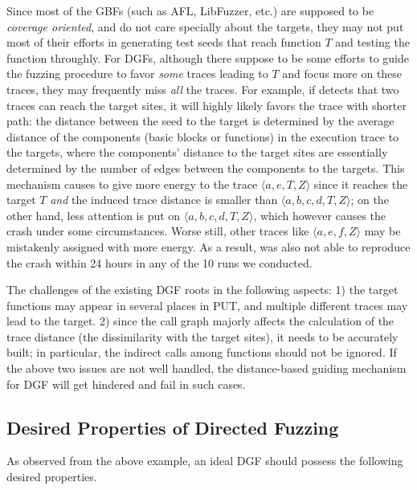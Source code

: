 Since most of the GBFs (such as AFL, LibFuzzer, etc.) are supposed to be \emph{coverage oriented}, and do not care specially about the targets, they may not put most of their efforts in generating test seeds that reach function $T$ and testing the function throughly. For DGFs, although there suppose to be some efforts to guide the fuzzing procedure to favor \emph{some} traces leading to $T$ and focus more on these traces, they may frequently miss \emph{all} the traces. For example, if \aflgo detects that two traces can reach the target sites, it will highly likely favors the trace with shorter path: the distance between the seed to the target is determined by the average distance of the components (basic blocks or functions) in the execution trace to the targets, where the components' distance to the target sites are essentially determined by the number of edges between the components to the targets. This mechanism causes \aflgo to give more energy to the trace $\langle a, e, T, Z\rangle$ since it reaches the target $T$ \emph{and} the induced trace distance is smaller than $\langle a, b, c, d, T, Z\rangle$; on the other hand, less attention is put on $\langle a, b, c, d, T, Z\rangle$, which however causes the crash under some circumstances. Worse still, other traces like $\langle a, e, f, Z\rangle$ may be mistakenly assigned with more energy. As a result, \aflgo was also not able to reproduce the crash within 24 hours in any of the 10 runs we conducted.
 
The challenges of the existing DGF roots in the following aspects: 1) the target functions may appear in several places in PUT, and multiple different traces may lead to the target.  2) since the call graph majorly affects the calculation of the trace distance (the dissimilarity with the target sites), it needs to be accurately built;
in particular, the indirect calls among functions should not be ignored. If the above two issues are not well handled, the distance-based guiding mechanism for DGF will get hindered and fail in such cases.


\subsection{Desired Properties of Directed Fuzzing} \label{subsec:dp}

As observed from the above example, an ideal DGF should possess the following desired properties.


